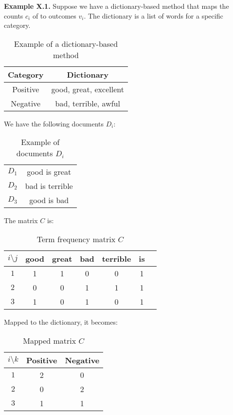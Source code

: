 \begin{examplebox}
    \textbf{Example X.1.} 
    Suppose we have a dictionary-based method 
    that maps the counts $c_i$ of
    to outcomes $v_i$.
    The dictionary is a list of words for 
    a specific category.

    \begin{table}[H]
        \centering
        \begin{tabular}{|c|c|}
            Category & Dictionary \\
            \hline
            Positive & good, great, excellent \\
            Negative & bad, terrible, awful \\
        \end{tabular}
        \caption{Example of a dictionary-based method}
    \end{table}

    We have the following documents $D_i$:

    \begin{table}[H]
        \centering
        \begin{tabular}{|c|c|}
            $D_1$ & good is great \\
            $D_2$ & bad is terrible \\
            $D_3$ & good is bad \\
        \end{tabular}
        \caption{Example of documents $D_i$}
    \end{table}

    The matrix $C$ is:

    \begin{table}[H]
        \centering
        \begin{tabular}{c|c|c|c|c|c|c}
            $i\setminus j$ & good & great & bad & terrible & is & \\
            \hline
            $1$ & 1 & 1 & 0 & 0 & 1  \\
            $2$ & 0 & 0 & 1 & 1 & 1  \\
            $3$ & 1 & 0 & 1 & 0 & 1  \\
        \end{tabular}
        \caption{Term frequency matrix $C$}
    \end{table}

    Mapped to the dictionary, it becomes:

    \begin{table}[H]
        \centering
        \begin{tabular}{c|c|c}
            $i\setminus k$ & Positive & Negative \\
            \hline
            $1$ & 2 & 0  \\
            $2$ & 0 & 2  \\
            $3$ & 1 & 1  \\
        \end{tabular}
        \caption{Mapped matrix $C$}
    \end{table}


\end{examplebox}
